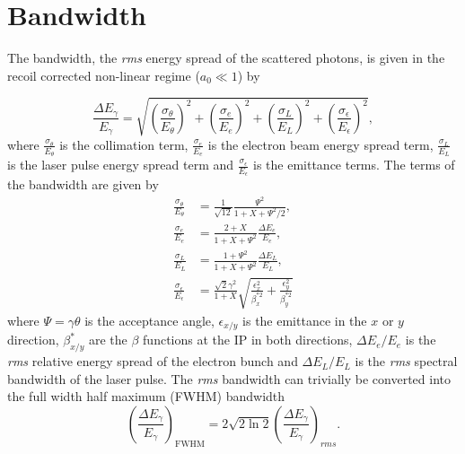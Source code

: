 \documentclass[../main.tex]{subfiles}
\begin{document}
\section{Bandwidth}
\label{sec:bandwidth}

The bandwidth, the \textit{rms} energy spread of the scattered photons, is given in the recoil corrected non-linear regime ($a_{0}\ll 1$) \cite{ranjan2018simulation} by

\begin{equation}
\frac{\Delta E_{\gamma}}{E_{\gamma}} = \sqrt{\left(\frac{\sigma_{\theta}}{E_{\theta}}\right)^{2}+\left(\frac{\sigma_{e}}{E_{e}}\right)^{2}+\left(\frac{\sigma_{L}}{E_{L}}\right)^{2}+\left(\frac{\sigma_{\epsilon}}{E_{\epsilon}}\right)^{2}},
\label{eq:RMS_bandwidth}    
\end{equation}
where $\frac{\sigma_{\theta}}{E_{\theta}}$ is the collimation term, $\frac{\sigma_{e}}{E_{e}}$ is the electron beam energy spread term, $\frac{\sigma_{L}}{E_{L}}$ is the laser pulse energy spread term and $\frac{\sigma_{\epsilon}}{E_{\epsilon}}$ is the emittance terms. The terms of the bandwidth are given by
\begin{align}
\frac{\sigma_{\theta}}{E_{\theta}} &= \frac{1}{\sqrt{12}}\frac{\Psi^{2}}{1+X+\Psi^{2}/2},
\label{eq:collimation_term} \\
\frac{\sigma_{e}}{E_{e}} &= \frac{2+X}{1+X+\Psi^{2}}\frac{\Delta E_{e}}{E_{e}},
\label{eq:beam_energy_spread_term} \\
\frac{\sigma_{L}}{E_{L}} &= \frac{1+\Psi^{2}}{1+X+\Psi^{2}}\frac{\Delta E_{L}}{E_{L}},
\label{eq:laser_energy_spread_term} \\
\frac{\sigma_{\epsilon}}{E_{\epsilon}} &= \frac{\sqrt{2}\gamma^{2}}{1+X}\sqrt{\frac{\epsilon_{x}^{2}}{\beta_{x}^{*2}}+\frac{\epsilon_{y}^{2}}{\beta_{y}^{*2}}}
\label{eq:emittance_term}
\end{align}
where $\Psi = \gamma\theta$ is the acceptance angle, $\epsilon_{x/y}$ is the emittance in the $x$ or $y$ direction, $\beta_{x/y}^{*}$ are the $\beta$ functions at the IP in both directions, $\Delta E_{e}/E_{e}$ is the \textit{rms} relative energy spread of the electron bunch and $\Delta E_{L}/E_{L}$ is the \textit{rms} spectral bandwidth of the laser pulse. The \textit{rms} bandwidth can trivially be converted into the full width half maximum (FWHM) bandwidth 
\begin{equation}
\left(\frac{\Delta E_{\gamma}}{E_{\gamma}}\right)_{\mathrm{FWHM}} = 2\sqrt{2\ln{2}}\left(\frac{\Delta E_{\gamma}}{E_{\gamma}}\right)_{rms}.
\label{eq:FWHM_bandwidth}
\end{equation}
\end{document}
